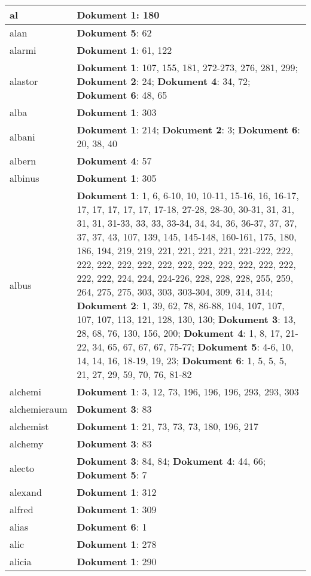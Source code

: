\documentclass[a5paper]{article}
\begin{document}
\begin{longtable}[l]{|l|p{3in}|}
\hline
al & \textbf{Dokument 1}: 180 \\
\hline
alan & \textbf{Dokument 5}: 62 \\
\hline
alarmi & \textbf{Dokument 1}: 61, 122 \\
\hline
alastor & \textbf{Dokument 1}: 107, 155, 181, 272-273, 276, 281, 299; \textbf{Dokument 2}: 24; \textbf{Dokument 4}: 34, 72; \textbf{Dokument 6}: 48, 65 \\
\hline
alba & \textbf{Dokument 1}: 303 \\
\hline
albani & \textbf{Dokument 1}: 214; \textbf{Dokument 2}: 3; \textbf{Dokument 6}: 20, 38, 40 \\
\hline
albern & \textbf{Dokument 4}: 57 \\
\hline
albinus & \textbf{Dokument 1}: 305 \\
\hline
albus & \textbf{Dokument 1}: 1, 6, 6-10, 10, 10-11, 15-16, 16, 16-17, 17, 17, 17, 17, 17, 17-18, 27-28, 28-30, 30-31, 31, 31, 31, 31, 31-33, 33, 33, 33-34, 34, 34, 36, 36-37, 37, 37, 37, 37, 43, 107, 139, 145, 145-148, 160-161, 175, 180, 186, 194, 219, 219, 221, 221, 221, 221, 221-222, 222, 222, 222, 222, 222, 222, 222, 222, 222, 222, 222, 222, 222, 222, 224, 224, 224-226, 228, 228, 228, 255, 259, 264, 275, 275, 303, 303, 303-304, 309, 314, 314; \textbf{Dokument 2}: 1, 39, 62, 78, 86-88, 104, 107, 107, 107, 107, 113, 121, 128, 130, 130; \textbf{Dokument 3}: 13, 28, 68, 76, 130, 156, 200; \textbf{Dokument 4}: 1, 8, 17, 21-22, 34, 65, 67, 67, 67, 75-77; \textbf{Dokument 5}: 4-6, 10, 14, 14, 16, 18-19, 19, 23; \textbf{Dokument 6}: 1, 5, 5, 5, 21, 27, 29, 59, 70, 76, 81-82 \\
\hline
alchemi & \textbf{Dokument 1}: 3, 12, 73, 196, 196, 196, 293, 293, 303 \\
\hline
alchemieraum & \textbf{Dokument 3}: 83 \\
\hline
alchemist & \textbf{Dokument 1}: 21, 73, 73, 73, 180, 196, 217 \\
\hline
alchemy & \textbf{Dokument 3}: 83 \\
\hline
alecto & \textbf{Dokument 3}: 84, 84; \textbf{Dokument 4}: 44, 66; \textbf{Dokument 5}: 7 \\
\hline
alexand & \textbf{Dokument 1}: 312 \\
\hline
alfred & \textbf{Dokument 1}: 309 \\
\hline
alias & \textbf{Dokument 6}: 1 \\
\hline
alic & \textbf{Dokument 1}: 278 \\
\hline
alicia & \textbf{Dokument 1}: 290 \\

\end{longtable}
\end{document}
